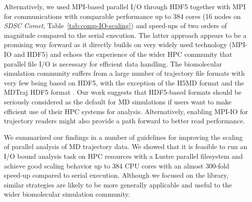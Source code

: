 Alternatively, we used MPI-based parallel I/O through HDF5 together with MPI for communications with comparable performance up to 384 cores (16 nodes on \emph{SDSC Comet}, Table~\ref{tab:comp-IO-scaling}) and speed-ups of two orders of magnitude compared to the serial execution.
The latter approach appears to be a promising way forward as it directly builds on very widely used technology (MPI-IO and HDF5) and echoes the experience of the wider HPC community that parallel file I/O is necessary for efficient data handling.
The biomolecular simulation community suffers from a large number of trajectory file formats with very few being based on HDF5, with the exception of the H5MD format \cite{Buyl:2014aa} and the MDTraj HDF5 format \cite{McGibbon:2015aa}.
Our work suggests that HDF5-based formats should be seriously considered as the default for MD simulations if users want to make efficient use of their HPC systems for analysis. 
Alternatively, enabling MPI-IO for trajectory readers might also provide a path forward to better read performance.

We summarized our findings in a number of guidelines for improving the scaling of parallel analysis of MD trajectory data.
We showed that it is feasible to run an I/O bound analysis task on HPC resources with a Lustre parallel filesystem and achieve good scaling behavior up to 384 CPU cores with an almost 300-fold speed-up compared to serial execution.
Although we focused on the  library, similar strategies are likely to be more generally applicable and useful to the wider biomolecular simulation community.


